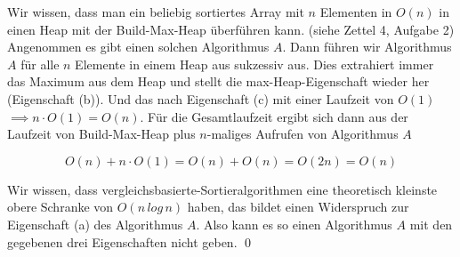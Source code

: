 \documentclass[ngerman,landscape,twocolumn]{adtexsheet}
\begin{document}
Wir wissen, dass man ein beliebig sortiertes Array mit $n$  Elementen in $O(n)$ in einen Heap mit der Build-Max-Heap überführen kann. (siehe Zettel 4, Aufgabe 2)\\
Angenommen es gibt einen solchen Algorithmus $A$. Dann führen wir Algorithmus $A$ für alle $n$ Elemente in einem Heap aus sukzessiv aus. Dies extrahiert immer das Maximum aus dem Heap und stellt die max-Heap-Eigenschaft wieder her (Eigenschaft (b)). Und das nach Eigenschaft (c) mit einer Laufzeit von $O(1)$ $\implies n \cdot O(1) = O(n)$. Für die Gesamtlaufzeit ergibt sich dann aus der Laufzeit von Build-Max-Heap plus $n$-maliges Aufrufen von Algorithmus $A$ 

$$O(n) + n \cdot O(1) = O(n) +O(n) = O(2n) = O(n)$$

Wir wissen, dass vergleichsbasierte-Sortieralgorithmen eine theoretisch kleinste obere Schranke von $O(n\,log\,n)$ haben, das bildet einen Widerspruch zur Eigenschaft (a) des Algorithmus $A$. Also kann es so einen Algorithmus $A$ mit den gegebenen drei Eigenschaften nicht geben. \qed
\end{document}
